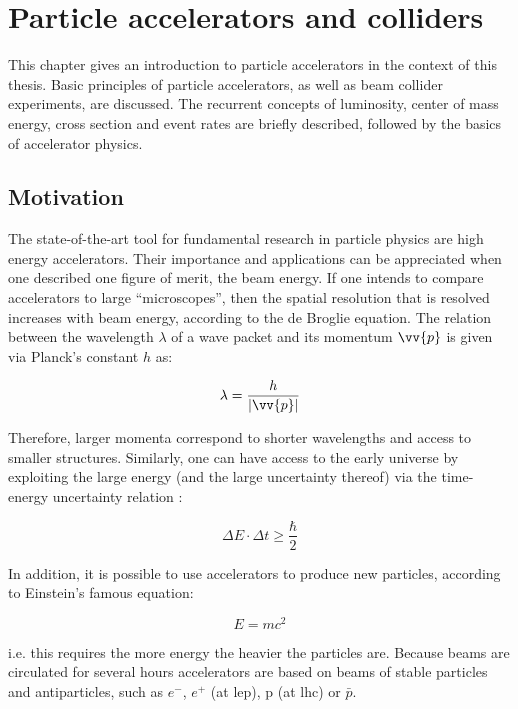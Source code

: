 \documentclass[encoding=utf8,british]{tumphthesis}
\begin{document}
\appendix


\chapter{Particle accelerators and colliders}
\label{appendix-chapter:particle-accelerators}

This chapter gives an introduction to particle accelerators in the context of this thesis. Basic principles of particle accelerators, as well as beam collider experiments, are discussed. The recurrent concepts of luminosity, center of mass energy, cross section and event rates are briefly described, followed by the basics of accelerator physics.


\section{Motivation}
The state-of-the-art tool for fundamental research in particle physics are high energy accelerators. Their importance and applications can be appreciated when one described one figure of merit, the beam energy. If one intends to compare accelerators to large “microscopes”, then the spatial resolution that is resolved increases with beam energy, according to the de Broglie equation. The relation between the wavelength $\lambda$ of a wave packet and its momentum $\vv{p}$ is given via Planck's constant $h$ as:

\begin{equation}
    \lambda = \frac{h}{|\vv{p}|}
\end{equation}


Therefore, larger momenta correspond to shorter wavelengths and access to smaller structures. Similarly, one can have access to the early universe by exploiting the large energy (and the large uncertainty thereof) via the time-energy uncertainty relation \cite{Heisenberg1927}:

\begin{equation}
    \Delta E \cdot \Delta t \geq \frac{\hbar}{2}
\end{equation}

In addition, it is possible to use accelerators to produce new particles, according to Einstein's famous equation:

\begin{equation}
    E = m c^2
\end{equation}

i.e. this requires the more energy the heavier the particles are. Because beams are circulated for several hours accelerators are based on beams of stable particles and antiparticles, such as $e^-$, $e^+$ (at  \acrshort{lep}), p (at \acrshort{lhc}) or $\bar{p}$.
\end{document}
